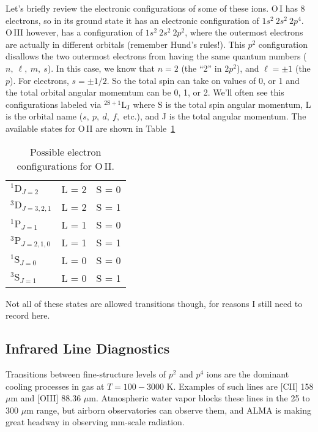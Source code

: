 \documentclass[10pt]{article}
\numberwithin{equation}{section}
\newcommand{\n}{\noindent}
\begin{document}
\n Let's briefly review the electronic configurations of some of these ions. O\,I has 8 electrons, so in its ground state it has an electronic configuration of $1s^2\ 2s^2\ 2p^4$. O\,III however, has a configuration of $1s^2\ 2s^2\ 2p^2$, where the outermost electrons are actually in different orbitals (remember Hund's rules!). This $p^2$ configuration disallows the two outermost electrons from having the same quantum numbers ($n,\ \ell,\ m,\ s$). In this case, we know that $n=2$ (the ``2'' in $2p^2$), and $\ell=\pm1$ (the $p$). For electrons, $s = \pm 1/2$. So the total spin can take on values of 0, or 1 and the total orbital angular momemtum can be 0, 1, or 2. We'll often see this configurations labeled via $\mathrm{^{2S+1}L_J}$ where S is the total spin angular momentum, L is the orbital name ($s,\ p,\ d,\ f,$ etc.), and J is the total angular momentum. The available states for O\,II are shown in Table~\ref{tab:oii}
\begin{table}
  \centering
  \begin{tabular}{l l l}
    $^1\mathrm{D}_{J=2}$ & L = 2 & S = 0\\
    $^3\mathrm{D}_{J=3,2,1}$ & L = 2 & S = 1 \\
    $^1\mathrm{P}_{J=1}$ & L = 1 & S = 0\\
    $^3\mathrm{P}_{J=2,1,0}$ & L = 1 & S = 1\\
    $^1\mathrm{S}_{J=0}$ & L = 0 & S = 0\\
    $^3\mathrm{S}_{J=1}$ & L = 0 & S = 1
  \end{tabular}
  \caption{Possible electron configurations for O\,II.}
  \label{tab:oii}
\end{table}
  Not all of these states are allowed transitions though, for reasons I still
  need to record here.

\subsection{Infrared Line Diagnostics} %
\label{sub:infrared_line_diagnostics}
Transitions between fine-structure levels of $p^2$ and $p^4$ ions are the
dominant cooling processes in gas at $T = 100-3000$ K. Examples of such lines
are [CII] 158 $\mu$m and [OIII] 88.36 $\mu$m. Atmospheric water vapor blocks
these lines in the 25 to 300 $\mu$m range, but airborn observatories can
observe them, and ALMA is making great headway in observing mm-scale
radiation.\\
\end{document}
